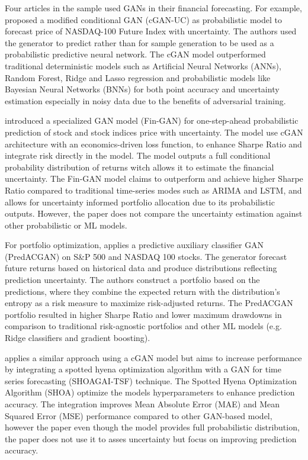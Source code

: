 Four articles in the sample used GANs in their financial forecasting. For example, \textcite{lee2021estimation} proposed a modified conditional GAN (cGAN-UC) as probabilistic model to forecast price of NASDAQ-100 Future Index with uncertainty. The authors used the generator to predict rather than for sample generation to be used as a probabilistic predictive neural network. The cGAN model outperformed traditional deterministic models such as Artificial Neural Networks (ANNs), Random Forest, Ridge and Lasso regression and probabilistic models like Bayesian Neural Networks (BNNs) for both point accuracy and uncertainty estimation especially in noisy data due to the benefits of adversarial training. 

\textcite{vuletic2024finGAN} introduced a specialized GAN model (Fin-GAN) for one-step-ahead probabilistic prediction of stock and stock indices price with uncertainty. The model use cGAN architecture with an economics-driven loss function, to enhance Sharpe Ratio and integrate risk directly in the model. The model outputs a full conditional probability distribution of returns witch allows it to estimate the financial uncertainty. The Fin-GAN model claims to outperform and achieve higher Sharpe Ratio compared to traditional time-series modes such as ARIMA and LSTM, and allows for uncertainty informed portfolio allocation due to its probabilistic outputs. However, the paper does not compare the uncertainty estimation against other probabilistic or ML models. 

For portfolio optimization, \textcite{kim2023portfolio} applies a predictive auxiliary classifier GAN (PredACGAN) on S\&P 500 and NASDAQ 100 stocks. The generator forecast future returns based on historical data and produce distributions reflecting prediction uncertainty. The authors construct a portfolio based on the predictions, where they combine the expected return with the distribution's entropy as a risk measure to maximize risk-adjusted returns. The PredACGAN portfolio resulted in higher Sharpe Ratio and lower maximum drawdowns in comparison to traditional risk-agnostic portfolios and other ML models (e.g. Ridge classifiers and gradient boosting).

\textcite{salama2024gan} applies a similar approach using a cGAN model but aims to increase performance by integrating a spotted hyena optimization algorithm with a GAN for time series forecasting (SHOAGAI-TSF) technique. The Spotted Hyena Optimization Algorithm (SHOA) optimize the models hyperparameters to enhance prediction accuracy. The integration improves Mean Absolute Error (MAE) and Mean Squared Error (MSE) performance compared to other GAN-based model, however the paper even though the model provides full probabilistic distribution, the paper does not use it to asses uncertainty but focus on improving prediction accuracy. 


